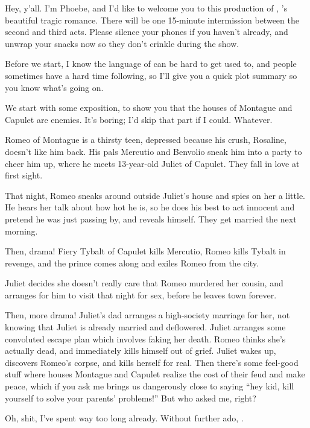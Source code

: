 \begin{dialogue}
   Hey, y'all. I'm Phoebe, and I'd like to welcome you to this production of
  \theplay{}, \billy{}'s beautiful tragic romance. There will be one 15-minute
  intermission between the second and third acts. Please silence your phones if you
  haven't already, and unwrap your snacks now so they don't crinkle during the show.

  Before we start, I know the language of \billy{} can be hard to get used to, and people
  sometimes have a hard time following, so I'll give you a quick plot summary so you know
  what's going on.

  We start with some exposition, to show you that the houses of Montague and Capulet are
  enemies. It's boring; I'd skip that part if I could. Whatever.

  Romeo of Montague is a thirsty teen, depressed because his crush, Rosaline, doesn't like
  him back. His pals Mercutio and Benvolio sneak him into a party to cheer him up, where
  he meets 13-year-old Juliet of Capulet. They fall in love at first sight. 

  That night, Romeo sneaks around outside Juliet's house and spies on her a little. He
  hears her talk about how hot he is, so he does his best to act innocent and pretend he
  was just passing by, and reveals himself. They get married the next morning.

  Then, drama! Fiery Tybalt of Capulet kills Mercutio, Romeo kills Tybalt in revenge, and
  the prince comes along and exiles Romeo from the city.

  Juliet decides she doesn't really care that Romeo murdered her cousin, and arranges for
  him to visit that night for sex, before he leaves town forever.

  Then, more drama! Juliet's dad arranges a high-society marriage for her, not knowing
  that Juliet is already married and deflowered. Juliet arranges some convoluted escape
  plan which involves faking her death. Romeo thinks she's actually dead, and immediately
  kills himself out of grief. Juliet wakes up, discovers Romeo's corpse, and kills herself
  for real. Then there's some feel-good stuff where houses Montague and Capulet realize
  the cost of their feud and make peace, which if you ask me brings us dangerously close
  to saying  \enquote{hey kid, kill yourself to solve your parents'
    problems!} But who asked me, right?

   Oh, shit, I've spent way too long already. Without further ado,
  .
\end{dialogue}

